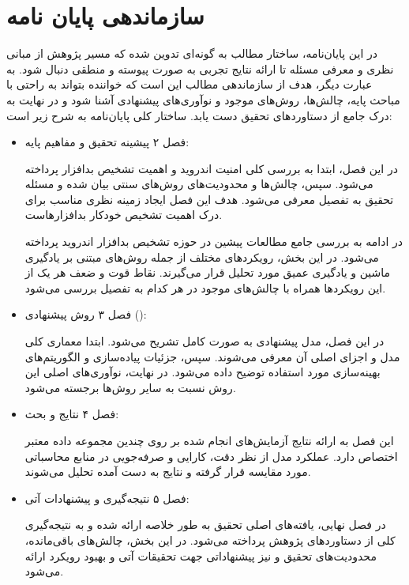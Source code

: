 \section{سازماندهی پایان نامه}\label{organiz}
در این پایان‌نامه، ساختار مطالب به گونه‌ای تدوین شده که مسیر پژوهش از مبانی نظری و معرفی مسئله تا ارائه نتایج تجربی به صورت پیوسته و منطقی دنبال شود. به عبارت دیگر، هدف از سازماندهی مطالب این است که خواننده بتواند به راحتی با مباحث پایه، چالش‌ها، روش‌های موجود و نوآوری‌های پیشنهادی آشنا شود و در نهایت به درک جامع از دستاوردهای تحقیق دست یابد. ساختار کلی پایان‌نامه به شرح زیر است:
\begin{itemize}
    \renewcommand{\labelitemi}{\lr{$\bullet$}}
    \item فصل ۲ \lr{-} پیشینه تحقیق و مفاهیم پایه:
    
    در این فصل، ابتدا به بررسی کلی امنیت اندروید و اهمیت تشخیص بدافزار پرداخته می‌شود. سپس، چالش‌ها و محدودیت‌های روش‌های سنتی بیان شده و مسئله تحقیق به تفصیل معرفی می‌شود. هدف این فصل ایجاد زمینه نظری مناسب برای درک اهمیت تشخیص خودکار بدافزارهاست.
    
    در ادامه به بررسی جامع مطالعات پیشین در حوزه تشخیص بدافزار اندروید پرداخته می‌شود. در این بخش، رویکردهای مختلف از جمله روش‌های مبتنی بر یادگیری ماشین و یادگیری عمیق مورد تحلیل قرار می‌گیرند. نقاط قوت و ضعف هر یک از این رویکردها همراه با چالش‌های موجود در هر کدام به تفصیل بررسی می‌شود.
    
    \item فصل ۳ \lr{-} روش پیشنهادی ():
    
    در این فصل، مدل پیشنهادی  به صورت کامل تشریح می‌شود. ابتدا معماری کلی مدل و اجزای اصلی آن معرفی می‌شوند. سپس، جزئیات پیاده‌سازی و الگوریتم‌های بهینه‌سازی مورد استفاده توضیح داده می‌شود. در نهایت، نوآوری‌های اصلی این روش نسبت به سایر روش‌ها برجسته می‌شود.
    
    \item فصل ۴ \lr{-} نتایج و بحث:
    
    این فصل به ارائه نتایج آزمایش‌های انجام شده بر روی چندین مجموعه داده معتبر اختصاص دارد. عملکرد مدل  از نظر دقت، کارایی و صرفه‌جویی در منابع محاسباتی مورد مقایسه قرار گرفته و نتایج به دست آمده تحلیل می‌شوند.
    
    \item فصل ۵ \lr{-} نتیجه‌گیری و پیشنهادات آتی:
    
    در فصل نهایی، یافته‌های اصلی تحقیق به طور خلاصه ارائه شده و به نتیجه‌گیری کلی از دستاوردهای پژوهش پرداخته می‌شود. در این بخش، چالش‌های باقی‌مانده، محدودیت‌های تحقیق و نیز پیشنهاداتی جهت تحقیقات آتی و بهبود رویکرد ارائه می‌شود.
\end{itemize}


